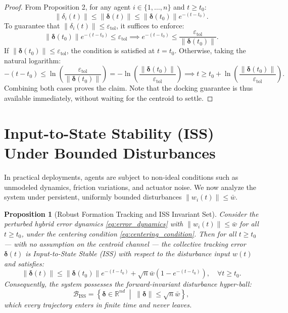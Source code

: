 \documentclass[11pt]{article}
\newtheorem{proposition}{Proposition}
\begin{document}
\begin{proof}
From Proposition 2, for any agent $i \in \{1, \dots, n\}$ and $t \ge t_0$:
\begin{equation}
\|\delta_i(t)\| \le \|\boldsymbol{\delta}(t)\| \le \|\boldsymbol{\delta}(t_0)\| e^{-(t - t_0)}.
\end{equation}
To guarantee that $\|\delta_i(t)\| \le \varepsilon_{\text{tol}}$, it suffices to enforce:
\begin{equation}
\|\boldsymbol{\delta}(t_0)\| e^{-(t - t_0)} \le \varepsilon_{\text{tol}} \implies e^{-(t - t_0)} \le \frac{\varepsilon_{\text{tol}}}{\|\boldsymbol{\delta}(t_0)\|}.
\end{equation}
If $\|\boldsymbol{\delta}(t_0)\| \le \varepsilon_{\text{tol}}$, the condition is satisfied at $t = t_0$. Otherwise, taking the natural logarithm:
\begin{equation}
-(t - t_0) \le \ln\left(\frac{\varepsilon_{\text{tol}}}{\|\boldsymbol{\delta}(t_0)\|}\right) = -\ln\left(\frac{\|\boldsymbol{\delta}(t_0)\|}{\varepsilon_{\text{tol}}}\right) \implies t \ge t_0 + \ln\left(\frac{\|\boldsymbol{\delta}(t_0)\|}{\varepsilon_{\text{tol}}}\right).
\end{equation}
Combining both cases proves the claim. Note that the docking guarantee is thus available immediately, without waiting for the centroid to settle.
\end{proof}

\section{Input-to-State Stability (ISS) Under Bounded Disturbances}

In practical deployments, agents are subject to non-ideal conditions such as unmodeled dynamics, friction variations, and actuator noise. We now analyze the system under persistent, uniformly bounded disturbances $\|w_i(t)\| \le \bar{w}$.

\begin{proposition}[Robust Formation Tracking and ISS Invariant Set]
Consider the perturbed hybrid error dynamics \eqref{eq:error_dynamics} with $\|w_i(t)\| \le \bar{w}$ for all $t \ge t_0$, under the centering condition \eqref{eq:centering_condition}. Then for \emph{all} $t \ge t_0$ --- with no assumption on the centroid channel --- the collective tracking error $\boldsymbol{\delta}(t)$ is Input-to-State Stable (ISS) with respect to the disturbance input $w(t)$ and satisfies:
\begin{equation}
\|\boldsymbol{\delta}(t)\| \le \|\boldsymbol{\delta}(t_0)\| e^{-(t - t_0)} + \sqrt{n}\bar{w}\left(1 - e^{-(t - t_0)}\right), \quad \forall t \ge t_0.
\label{eq:iss_trajectory_bound}
\end{equation}
Consequently, the system possesses the forward-invariant disturbance hyper-ball:
\begin{equation}
\mathcal{B}_{\text{ISS}} = \left\{ \boldsymbol{\delta} \in \mathbb{R}^{nd} \;\middle|\; \|\boldsymbol{\delta}\| \le \sqrt{n}\bar{w} \right\},
\label{eq:b_iss_def}
\end{equation}
which every trajectory enters in finite time and never leaves.
\end{proposition}
\end{document}
